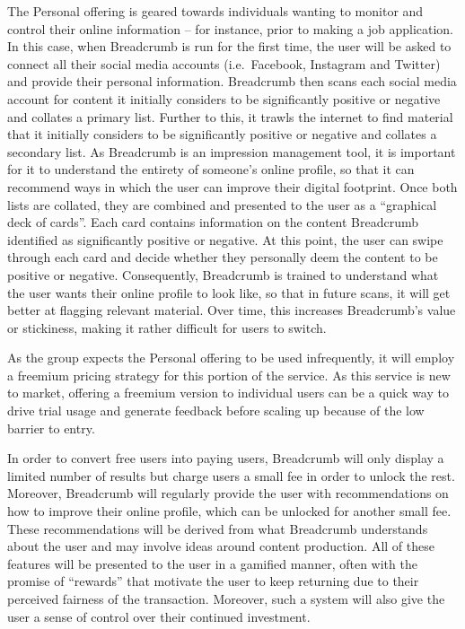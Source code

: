 The Personal offering is geared towards individuals wanting to monitor and control their online information -- for instance, prior to making a job application. In this case, when Breadcrumb is run for the first time, the user will be asked to connect all their social media accounts (i.e.~Facebook, Instagram and Twitter) and provide their personal information. Breadcrumb then scans each social media account for content it initially considers to be significantly positive or negative and collates a primary list. Further to this, it trawls the internet to find material that it initially considers to be significantly positive or negative and collates a secondary list. As Breadcrumb is an impression management tool, it is important for it to understand the entirety of someone's online profile, so that it can recommend ways in which the user can improve their digital footprint. Once both lists are collated, they are combined and presented to the user as a ``graphical deck of cards''. Each card contains information on the content Breadcrumb identified as significantly positive or negative. At this point, the user can swipe through each card and decide whether they personally deem the content to be positive or negative. Consequently, Breadcrumb is trained to understand what the user wants their online profile to look like, so that in future scans, it will get better at flagging relevant material. Over time, this increases Breadcrumb's value or stickiness, making it rather difficult for users to switch.

As the group expects the Personal offering to be used infrequently, it will employ a freemium pricing strategy for this portion of the service. As this service is new to market, offering a freemium version to individual users can be a quick way to drive trial usage and generate feedback before scaling up because of the low barrier to entry.

In order to convert free users into paying users, Breadcrumb will only display a limited number of results but charge users a small fee in order to unlock the rest. Moreover, Breadcrumb will regularly provide the user with recommendations on how to improve their online profile, which can be unlocked for another small fee. These recommendations will be derived from what Breadcrumb understands about the user and may involve ideas around content production. All of these features will be presented to the user in a gamified manner, often with the promise of ``rewards'' that motivate the user to keep returning due to their perceived fairness of the transaction. Moreover, such a system will also give the user a sense of control over their continued investment.

